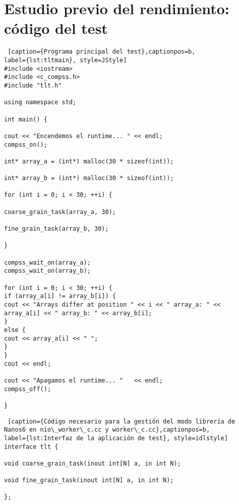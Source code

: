 \section{Estudio previo del rendimiento: código del test}
\label{appendix:estudioprevio}

\begin{lstlisting} [caption={Programa principal del test},captionpos=b, 
label={lst:tltmain}, style=JStyle]
#include <iostream>
#include <c_compss.h>
#include "tlt.h"

using namespace std;

int main() {

cout << "Encendemos el runtime... " << endl;
compss_on();

int* array_a = (int*) malloc(30 * sizeof(int));

int* array_b = (int*) malloc(30 * sizeof(int));

for (int i = 0; i < 30; ++i) {

coarse_grain_task(array_a, 30);

fine_grain_task(array_b, 30);

}

compss_wait_on(array_a);
compss_wait_on(array_b);   

for (int i = 0; i < 30; ++i) {
if (array_a[i] != array_b[i]) {
cout << "Arrays differ at position " << i << " array_a: " << array_a[i] << " array_b: " << array_b[i];
}
else {
cout << array_a[i] << " ";
}
}
cout << endl;

cout << "Apagamos el runtime... "   << endl;
compss_off();

}   
\end{lstlisting}

\begin{lstlisting} [caption={Código necesario para la gestión del modo librería de Nanos6 en nio\_worker\_c.cc y worker\_c.cc},captionpos=b, 
label={lst:Interfaz de la aplicación de test}, style=idlstyle] 
interface tlt {

void coarse_grain_task(inout int[N] a, in int N);

void fine_grain_task(inout int[N] a, in int N);

};
\end{lstlisting}

\newpage

